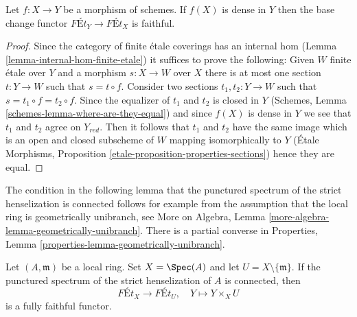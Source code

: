 \begin{lemma}
\label{lemma-dense-faithful}
Let $f : X \to Y$ be a morphism of schemes. If $f(X)$ is dense in $Y$
then the base change functor $\textit{F\'Et}_Y \to \textit{F\'Et}_X$
is faithful.
\end{lemma}

\begin{proof}
Since the category of finite \'etale coverings has an
internal hom (Lemma \ref{lemma-internal-hom-finite-etale})
it suffices to prove the following: Given $W$ finite \'etale over $Y$
and a morphism $s : X \to W$ over $X$ there is at most one section
$t : Y \to W$ such that $s = t \circ f$. Consider two sections
$t_1, t_2 : Y \to W$ such that $s = t_1 \circ f = t_2 \circ f$.
Since the equalizer of $t_1$ and $t_2$ is closed in $Y$
(Schemes, Lemma \ref{schemes-lemma-where-are-they-equal})
and since $f(X)$ is dense in $Y$ we see that $t_1$ and $t_2$
agree on $Y_{red}$. Then it follows that $t_1$ and $t_2$ have
the same image which is an open and closed subscheme of $W$ mapping
isomorphically to $Y$
(\'Etale Morphisms, Proposition \ref{etale-proposition-properties-sections})
hence they are equal.
\end{proof}

\noindent
The condition in the following lemma that the punctured spectrum
of the strict henselization is connected follows for example from
the assumption that the local ring is geometrically unibranch, see
More on Algebra, Lemma \ref{more-algebra-lemma-geometrically-unibranch}.
There is a partial converse in
Properties, Lemma \ref{properties-lemma-geometrically-unibranch}.

\begin{lemma}
\label{lemma-same-etale-extensions}
Let $(A, \mathfrak m)$ be a local ring. Set $X = \Spec(A)$
and let $U = X \setminus \{\mathfrak m\}$. If the punctured spectrum
of the strict henselization of $A$ is connected, then
$$
\textit{F\'Et}_X \longrightarrow \textit{F\'Et}_U,\quad
Y \longmapsto Y \times_X U
$$
is a fully faithful functor.
\end{lemma}

